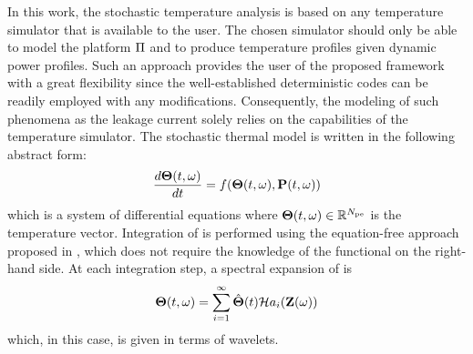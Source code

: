 In this work, the stochastic temperature analysis is based on any temperature simulator that is available to the user. The chosen simulator should only be able to model the platform $\Pi$ and to produce temperature profiles given dynamic power profiles. Such an approach provides the user of the proposed framework with a great flexibility since the well-established deterministic codes can be readily employed with any modifications. Consequently, the modeling of such phenomena as the leakage current solely relies on the capabilities of the temperature simulator. The stochastic thermal model is written in the following abstract form:
\begin{equation} \elabel{thermal-model}
  \frac{d\vT(\t, \o)}{dt} = f(\vT(\t, \o), \vPP(\t, \o))
\end{equation}
which is a system of differential equations where ${\boldsymbol\Theta}(t, \omega) \in \mathbb{R}^{N_\text{pe}}$ is the temperature vector. Integration of  is performed using the equation-free approach proposed in \cite{xiu2005}, which does not require the knowledge of the functional on the right-hand side. At each integration step, a spectral expansion of  is
\[
  {\boldsymbol\Theta}(t, \omega) = \sum_{i = 1}^\infty \hat{{\boldsymbol\Theta}}(t) \mathcal{H}a_i(\mathbf{Z}(\omega))
\]
which, in this case, is given in terms of wavelets.
